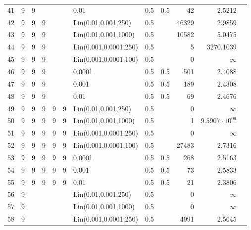 \begin{longtable}{lrrrrrlrrrrr}
   41 &       9 & 9 &   &   &   &                  0.01 &  0.5 &    0.5 &      42 &                 2.5212 \\
   42 &       9 & 9 & 9 &   &   &   Lin(0.01,0.001,250) &  0.5 &        &   46329 &                 2.9859 \\
   43 &       9 & 9 & 9 &   &   &  Lin(0.01,0.001,1000) &  0.5 &        &   10582 &                 5.0475 \\
   44 &       9 & 9 & 9 &   &   & Lin(0.001,0.0001,250) &  0.5 &        &       5 &              3270.1039 \\
   45 &       9 & 9 & 9 &   &   & Lin(0.001,0.0001,100) &  0.5 &        &       0 &               $\infty$ \\
   46 &       9 & 9 & 9 &   &   &                0.0001 &  0.5 &    0.5 &     501 &                 2.4088 \\
   47 &       9 & 9 & 9 &   &   &                 0.001 &  0.5 &    0.5 &     189 &                 2.4308 \\
   48 &       9 & 9 & 9 &   &   &                  0.01 &  0.5 &    0.5 &      69 &                 2.4676 \\
   49 &       9 & 9 & 9 & 9 & 9 &   Lin(0.01,0.001,250) &  0.5 &        &       0 &               $\infty$ \\
   50 &       9 & 9 & 9 & 9 & 9 &  Lin(0.01,0.001,1000) &  0.5 &        &       1 &  $9.5907\cdot 10^{09}$ \\
   51 &       9 & 9 & 9 & 9 & 9 & Lin(0.001,0.0001,250) &  0.5 &        &       0 &               $\infty$ \\
   52 &       9 & 9 & 9 & 9 & 9 & Lin(0.001,0.0001,100) &  0.5 &        &   27483 &                 2.7316 \\
   53 &       9 & 9 & 9 & 9 & 9 &                0.0001 &  0.5 &    0.5 &     268 &                 2.5163 \\
   54 &       9 & 9 & 9 & 9 & 9 &                 0.001 &  0.5 &    0.5 &      73 &                 2.5833 \\
   55 &       9 & 9 & 9 & 9 & 9 &                  0.01 &  0.5 &    0.5 &      21 &                 2.3806 \\
   56 &       9 &   &   &   &   &   Lin(0.01,0.001,250) &  0.5 &        &       0 &               $\infty$ \\
   57 &       9 &   &   &   &   &  Lin(0.01,0.001,1000) &  0.5 &        &       0 &               $\infty$ \\
   58 &       9 &   &   &   &   & Lin(0.001,0.0001,250) &  0.5 &        &    4991 &                 2.5645 \\

\end{longtable}
